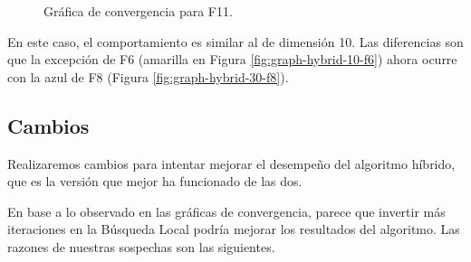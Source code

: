 \documentclass{article}
\begin{document}
\begin{figure}[H]
	\centering
	\caption{Gráfica de convergencia para F11.}
	\label{fig:graph-hybrid-30-f11}
\end{figure}

En este caso, el comportamiento es similar al de dimensión 10. Las diferencias son que la excepción de F6 (amarilla en Figura
\ref{fig:graph-hybrid-10-f6}) ahora ocurre con la azul de F8 (Figura \ref{fig:graph-hybrid-30-f8}).

\subsection{Cambios}

Realizaremos cambios para intentar mejorar el desempeño del algoritmo híbrido, que es la versión
que mejor ha funcionado de las dos.

En base a lo observado en las gráficas de convergencia, parece que invertir más iteraciones
en la Búsqueda Local podría mejorar los resultados del algoritmo. Las razones de nuestras sospechas
son las siguientes.
\end{document}
